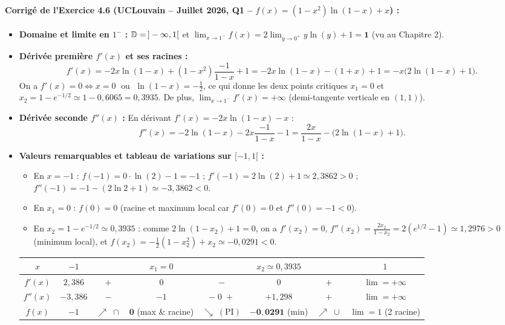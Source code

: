 \paragraph{Corrigé de l'Exercice 4.6 (UCLouvain -- Juillet 2026, Q1 -- $f(x) = (1-x^2)\ln(1-x)+x$) :}
\begin{itemize}
    \item \textbf{Domaine et limite en $1^-$ :} $\mathbb{D} = \,]-\infty, 1[$ et $\lim_{x \to 1^-} f(x) = 2\lim_{y \to 0^+} y\ln(y) + 1 = \mathbf{1}$ (vu au Chapitre 2).
    \item \textbf{Dérivée première $f'(x)$ et ses racines :}
    \[
        f'(x) = -2x\ln(1-x) + (1-x^2)\frac{-1}{1-x} + 1 = -2x\ln(1-x) - (1+x) + 1 = \boxed{-x\bigl(2\ln(1-x) + 1\bigr)}.
    \]
    On a $f'(x) = 0 \iff x = 0 \;\text{ ou }\; \ln(1-x) = -\frac{1}{2}$, ce qui donne les deux points critiques $\boxed{x_1 = 0}$ et $\boxed{x_2 = 1 - e^{-1/2} \simeq 1 - 0,6065 = 0,3935}$.
    De plus, $\lim_{x \to 1^-} f'(x) = +\infty$ (demi-tangente verticale en $(1, 1)$).
    \item \textbf{Dérivée seconde $f''(x)$ :} En dérivant $f'(x) = -2x\ln(1-x) - x$ :
    \[
        f''(x) = -2\ln(1-x) - 2x\frac{-1}{1-x} - 1 = \boxed{\frac{2x}{1-x} - \bigl(2\ln(1-x) + 1\bigr)}.
    \]
    \item \textbf{Valeurs remarquables et tableau de variations sur $[-1, 1[$ :}
    \begin{itemize}
        \item En $x = -1$ : $f(-1) = 0\cdot\ln(2) - 1 = -1$ ; $f'(-1) = 2\ln(2)+1 \simeq 2,3862 > 0$ ; $f''(-1) = -1 - (2\ln 2 + 1) \simeq -3,3862 < 0$.
        \item En $x_1 = 0$ : $f(0) = 0$ (racine et maximum local car $f'(0) = 0$ et $f''(0) = -1 < 0$).
        \item En $x_2 = 1 - e^{-1/2} \simeq 0,3935$ : comme $2\ln(1-x_2) + 1 = 0$, on a $f'(x_2) = 0$, $f''(x_2) = \frac{2x_2}{1-x_2} = 2(e^{1/2} - 1) \simeq 1,2976 > 0$ (minimum local), et $f(x_2) = -\frac{1}{2}(1-x_2^2) + x_2 \simeq -0,0291 < 0$.
    \end{itemize}
    \begin{center}
    {\footnotesize
    \renewcommand{\arraystretch}{1.35}
    \setlength{\tabcolsep}{3.0pt}
    \begin{tabular}{|c||c|c|c|c|c|c|c|}
    \hline
    $x$ & $-1$ & & $x_1 = 0$ & & $x_2 \simeq 0,3935$ & & $1$ \\ \hline\hline
    $f'(x)$ & $2,386$ & $+$ & $0$ & $-$ & $0$ & $+$ & $\lim = +\infty$ \\ \hline
    $f''(x)$ & $-3,386$ & $-$ & $-1$ & $-\;0\;+$ & $+1,298$ & $+$ & $\lim = +\infty$ \\ \hline
    $f(x)$ & $-1$ & $\nearrow\;\cap$ & $\mathbf{0}$ (max \& racine) & $\searrow\;(\text{PI})$ & $\mathbf{-0,0291}$ (min) & $\nearrow\;\cup$ & $\lim = 1$ (2\ieme{} racine) \\ \hline
    \end{tabular}
    }
    \end{center}
\end{itemize}

